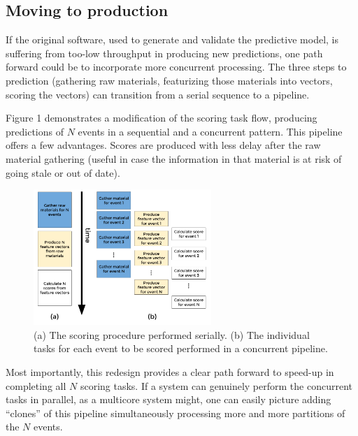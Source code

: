 \documentclass{article}
\begin{document}
\subsection{Moving to production}

If the original software, used to generate and validate the predictive model, is suffering from too-low throughput in producing new predictions, one path forward could be to incorporate more concurrent processing. The three steps to prediction (gathering raw materials, featurizing those materials into vectors, scoring the vectors) can transition from a serial sequence to a pipeline.

 Figure 1 demonstrates a modification of the scoring task flow, producing predictions of $N$ events in a sequential and a concurrent pattern.  This pipeline offers a few advantages. Scores are produced with less delay after the raw material gathering (useful in case the information in that material is at risk of going stale or out of date). 
 
 \begin{figure}[h]
\includegraphics[width=0.6\textwidth]{fig/tex/pipeline.png}
\centering
\caption{(a) The scoring procedure performed serially. (b) The individual tasks for each event to be scored performed in a concurrent pipeline.}
\end{figure}

Most importantly, this redesign provides a clear path forward to speed-up in completing all $N$ scoring tasks. If a system can genuinely perform the concurrent tasks in parallel, as a multicore system might, one can easily picture adding ``clones'' of this pipeline simultaneously processing more and more partitions of the $N$ events.
\end{document}
